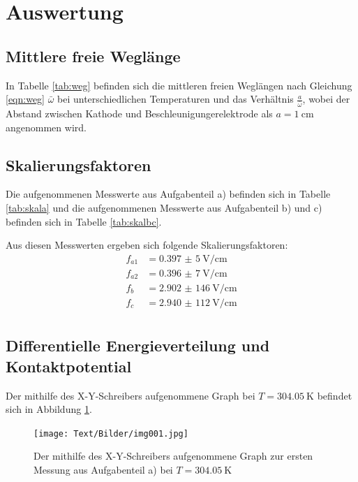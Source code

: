\section{Auswertung}

\subsection{Mittlere freie Weglänge}

In Tabelle \ref{tab:weg} befinden sich die mittleren freien Weglängen nach Gleichung \eqref{eqn:weg} $\bar{\omega}$ bei unterschiedlichen Temperaturen
und das Verhältnis $\frac{a}{\bar{\omega}}$, wobei der Abstand zwischen Kathode und Beschleunigungerelektrode als $a = \SI{1}{\cm}$
angenommen wird.


\subsection{Skalierungsfaktoren}

Die aufgenommenen Messwerte aus Aufgabenteil a) befinden sich in Tabelle \ref{tab:skala} und die aufgenommenen Messwerte aus Aufgabenteil
b) und c) befinden sich in Tabelle \ref{tab:skalbc}.



Aus diesen Messwerten ergeben sich folgende Skalierungsfaktoren:
\begin{align*}
  f_{a1} &= \SI{0,397(5)}{\V \per \cm} \\
  f_{a2} &= \SI{0,396(7)}{\V \per \cm} \\
  f_{b} &= \SI{2,902(146)}{\V \per \cm} \\
  f_{c} &= \SI{2,940(112)}{\V \per \cm} \\
\end{align*}

\subsection{Differentielle Energieverteilung und Kontaktpotential}
Der mithilfe des X-Y-Schreibers aufgenommene Graph bei $T = \SI{304,05}{\K}$ befindet sich in Abbildung \ref{fig:a1}.
\begin{figure}[H]
  \centering
  \texttt{[image: Text/Bilder/img001.jpg]}
  \caption{Der mithilfe des X-Y-Schreibers aufgenommene Graph zur ersten Messung aus Aufgabenteil a) bei $T = \SI{304,05}{\K}$}
  \label{fig:a1}
\end{figure}

